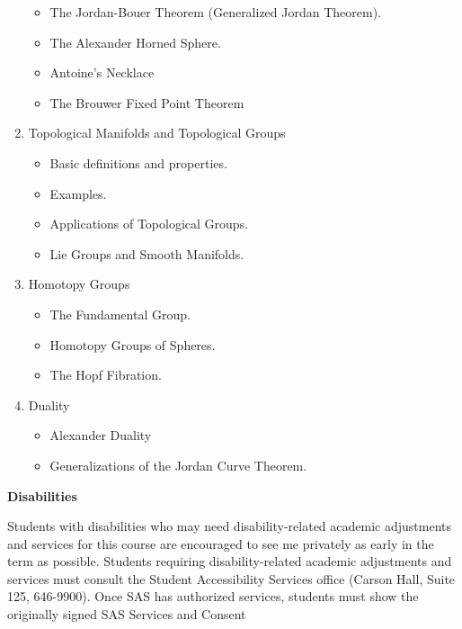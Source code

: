\documentclass{article}
\begin{document}
\begin{enumerate}
            \begin{itemize}
                \item The Jordan-Bouer Theorem (Generalized Jordan Theorem).
                \item The Alexander Horned Sphere.
                \item Antoine's Necklace
                \item The Brouwer Fixed Point Theorem
            \end{itemize}
        \item Topological Manifolds and Topological Groups
            \begin{itemize}
                \item Basic definitions and properties.
                \item Examples.
                \item Applications of Topological Groups.
                \item Lie Groups and Smooth Manifolds.
            \end{itemize}
        \item Homotopy Groups
            \begin{itemize}
                \item The Fundamental Group.
                \item Homotopy Groups of Spheres.
                \item The Hopf Fibration.
            \end{itemize}
        \item Duality
            \begin{itemize}
                \item Alexander Duality
                \item Generalizations of the Jordan Curve Theorem.
            \end{itemize}
    \end{enumerate}
    \textbf{Disabilities}
    \par\hfill\par
    Students with disabilities who may need disability-related academic
    adjustments and services for this course are encouraged to see me privately
    as early in the term as possible. Students requiring disability-related
    academic adjustments and services must consult the Student Accessibility
    Services office (Carson Hall, Suite 125, 646-9900). Once SAS has authorized
    services, students must show the originally signed SAS Services and Consent
\end{document}
